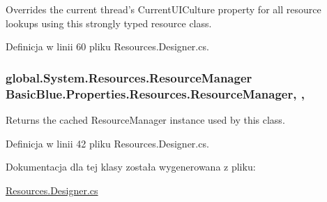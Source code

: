 Overrides the current thread's Current\-U\-I\-Culture property for all resource lookups using this strongly typed resource class. 



Definicja w linii 60 pliku Resources.\-Designer.\-cs.

\hypertarget{class_basic_blue_1_1_properties_1_1_resources_a8a26a2744c986299a8d32baa0f4303fe}{
\subsubsection[{Resource\-Manager}]{\setlength{\rightskip}{0pt plus 5cm}global.\-System.\-Resources.\-Resource\-Manager Basic\-Blue.\-Properties.\-Resources.\-Resource\-Manager\hspace{0.3cm}{\ttfamily [static]}, {\ttfamily [get]}, {\ttfamily [package]}}}\label{class_basic_blue_1_1_properties_1_1_resources_a8a26a2744c986299a8d32baa0f4303fe}


Returns the cached Resource\-Manager instance used by this class. 



Definicja w linii 42 pliku Resources.\-Designer.\-cs.



Dokumentacja dla tej klasy została wygenerowana z pliku\-:\begin{DoxyCompactItemize}
\item 
\hyperlink{_resources_8_designer_8cs}{Resources.\-Designer.\-cs}\end{DoxyCompactItemize}
